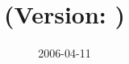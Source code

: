 \title{\projectname\\(Version: \projectversion)\\\projectdescription}
\author{\projectcredits}
\date{2006-04-11}
\maketitle
